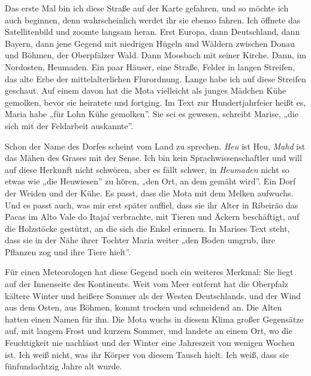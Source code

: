 \documentclass[
  ngerman,
  11pt,
  openany]{book}
\begin{document}
Das erste Mal bin ich diese Straße auf der Karte gefahren, und so möchte
ich auch beginnen, denn wahrscheinlich werdet ihr sie ebenso fahren. Ich
öffnete das Satellitenbild und zoomte langsam heran. Erst Europa, dann
Deutschland, dann Bayern, dann jene Gegend mit niedrigen Hügeln und
Wäldern zwischen Donau und Böhmen, der Oberpfälzer Wald. Dann Moosbach
mit seiner Kirche. Dann, im Nordosten, Heumaden. Ein paar Häuser, eine
Straße, Felder in langen Streifen, das alte Erbe der mittelalterlichen
Flurordnung. Lange habe ich auf diese Streifen geschaut. Auf einem davon
hat die Mota vielleicht als junges Mädchen Kühe gemolken, bevor sie
heiratete und fortging. Im Text zur Hundertjahrfeier heißt es, Maria
habe „für Lohn Kühe gemolken''. Sie sei es gewesen, schreibt Marise,
„die sich mit der Feldarbeit auskannte''.

Schon der Name des Dorfes scheint vom Land zu sprechen. \emph{Heu} ist
Heu, \emph{Mahd} ist das Mähen des Grases mit der Sense. Ich bin kein
Sprachwissenschaftler und will auf diese Herkunft nicht schwören, aber
es fällt schwer, in \emph{Heumaden} nicht so etwas wie „die Heuwiesen''
zu hören, „den Ort, an dem gemäht wird''. Ein Dorf der Weiden und der
Kühe. Es passt, dass die Mota mit dem Melken aufwuchs. Und es passt
auch, was mir erst später auffiel, dass sie ihr Alter in Ribeirão das
Pacas im Alto Vale do Itajaí verbrachte, mit Tieren und Äckern
beschäftigt, auf die Holzstöcke gestützt, an die sich die Enkel
erinnern. In Marises Text steht, dass sie in der Nähe ihrer Tochter
Maria weiter „den Boden umgrub, ihre Pflanzen zog und ihre Tiere
hielt''.

Für einen Meteorologen hat diese Gegend noch ein weiteres Merkmal: Sie
liegt auf der Innenseite des Kontinents. Weit vom Meer entfernt hat die
Oberpfalz kältere Winter und heißere Sommer als der Westen Deutschlands,
und der Wind aus dem Osten, aus Böhmen, kommt trocken und schneidend an.
Die Alten hatten einen Namen für ihn. Die Mota wuchs in diesem Klima
großer Gegensätze auf, mit langem Frost und kurzem Sommer, und landete
an einem Ort, wo die Feuchtigkeit nie nachlässt und der Winter eine
Jahreszeit von wenigen Wochen ist. Ich weiß nicht, was ihr Körper von
diesem Tausch hielt. Ich weiß, dass sie fünfundachtzig Jahre alt wurde.
\end{document}
